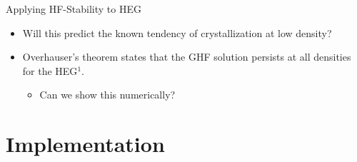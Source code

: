 \documentclass[10pt]{beamer}
\begin{document}
{{{{{{{{{%
\begin{frame}{Applying HF-Stability to HEG}
	\begin{itemize}[<+->]
		\item{Will this predict the known tendency of crystallization at low density?}
		\item{Overhauser's theorem states that the GHF solution persists at all densities for the 
		HEG$^1$.}
		\begin{itemize}
  		\item{Can we show this numerically?}
  	\end{itemize}
	\end{itemize}
\end{frame}


\section{Implementation}

{%

}}}}}}}}}}
\end{document}
